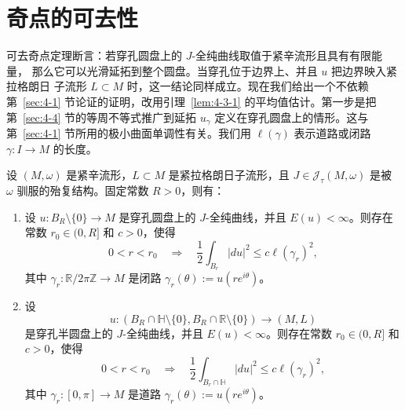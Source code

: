 
\section{奇点的可去性}\label{sec:4-5}

可去奇点定理断言：若穿孔圆盘上的 $J$-全纯曲线取值于紧辛流形且具有有限能量，
那么它可以光滑延拓到整个圆盘。当穿孔位于边界上、并且 $u$ 把边界映入紧拉格朗日
子流形 $L\subset M$ 时，这一结论同样成立。现在我们给出一个不依赖第~\ref{sec:4-1}
节论证的证明，改用引理~\ref{lem:4-3-1} 的平均值估计。第一步是把第~\ref{sec:4-4}
节的等周不等式推广到延拓 $u_\gamma$ 定义在穿孔圆盘上的情形。这与
第~\ref{sec:4-1} 节所用的极小曲面单调性有关。我们用 $\ell(\gamma)$ 表示道路或闭路
$\gamma:I\to M$ 的长度。

\begin{lemma}\label{lem:4-5-1}
设 $(M,\omega)$ 是紧辛流形，$L\subset M$ 是紧拉格朗日子流形，且
$J\in\mathcal J_\tau(M,\omega)$ 是被 $\omega$ 驯服的殆复结构。固定常数 $R>0$，则有：
\begin{enumerate}[label=(\roman*),leftmargin=3em]
\item 设 $u:B_R\setminus\{0\}\to M$ 是穿孔圆盘上的 $J$-全纯曲线，并且
$E(u)<\infty$。则存在常数 $r_0\in(0,R]$ 和 $c>0$，使得
\[
  0<r<r_0
  \quad\Longrightarrow\quad
  \frac12\int_{B_r}|du|^2\le c\ell(\gamma_r)^2,
\]
其中 $\gamma_r:\mathbb R/2\pi\mathbb Z\to M$ 是闭路
$\gamma_r(\theta):=u(re^{i\theta})$。

\item 设
\[
  u:(B_R\cap\mathbb H\setminus\{0\},
  B_R\cap\mathbb R\setminus\{0\})\longrightarrow(M,L)
\]
是穿孔半圆盘上的 $J$-全纯曲线，并且 $E(u)<\infty$。则存在常数
$r_0\in(0,R]$ 和 $c>0$，使得
\[
  0<r<r_0
  \quad\Longrightarrow\quad
  \frac12\int_{B_r\cap\mathbb H}|du|^2\le c\ell(\gamma_r)^2,
\]
其中 $\gamma_r:[0,\pi]\to M$ 是道路
$\gamma_r(\theta):=u(re^{i\theta})$。
\end{enumerate}
\end{lemma}

